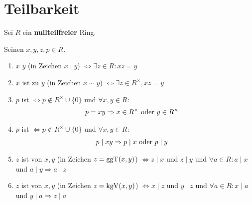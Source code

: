 \section{Teilbarkeit}

Sei $R$ ein \textbf{nullteilfreier} Ring.

\begin{definition}
	Seinen $x,y,z,p \in R$.
	\begin{enumerate}[label=(\alph*)]
		\item $x$  $y$ (in Zeichen $x \mid y$) $\Leftrightarrow \exists z \in R: xz = y$
		\item $x$ ist  zu $y$ (in Zeichen $x \sim y$) $\Leftrightarrow \exists z \in R^{\times}, xz = y$
		\item $p$ ist  $\Leftrightarrow p \not \in R^{\times} \cup \{  0\}$ und $\forall x,y \in R$:
		\begin{align}
			p = xy &\Rightarrow x \in R^{\times} \text{ oder } y \in R^{\times} \notag
		\end{align}
		\item $p$ ist  $\Leftrightarrow  p \not \in R^{\times} \cup \{ 0 \}$ und $\forall x,y \in R$:
		\begin{align}
			p \mid xy &\Rightarrow p \mid x \text{ oder } p \mid y \notag
		\end{align}
		\item $z$ ist  von $x,y$ (in Zeichen $z = \operatorname{ggT}(x,y)$) $\Leftrightarrow  z \mid x$ und $z \mid y$ und $\forall a \in R: a\mid x$ und $a \mid y\Rightarrow a \mid z$
		\item $z$ ist  von $x,y$ (in Zeichen $z = \operatorname{kgV}(x,y)$) $\Leftrightarrow x \mid z$ und $y \mid z$ und $\forall a \in R: x \mid a$ und $y \mid a \Rightarrow z \mid a$ 
	\end{enumerate}
\end{definition}

